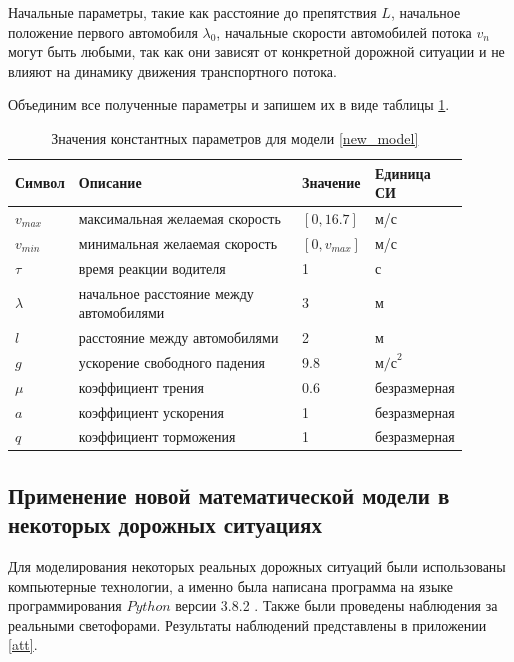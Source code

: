 \documentclass[12pt, a4paper]{extarticle}
\numberwithin{equation}{section}
\numberwithin{figure}{section}
\begin{document}
Начальные параметры, такие как расстояние до препятствия $L$, начальное положение первого автомобиля $\lambda_0$, начальные скорости автомобилей потока $v_n$ могут быть любыми, так как они зависят от конкретной дорожной ситуации и не влияют на динамику движения транспортного потока.

Объединим все полученные параметры и запишем их в виде таблицы \ref{real_parameters}.
\begin{table}[h!]
	\caption{Значения константных параметров для модели \eqref{new_model} }
	\label{real_parameters}
	\begin{center}
		\begin{tabularx}{\textwidth}{p{0.12\linewidth}p{0.52\linewidth}p{0.11\linewidth}p{0.15\linewidth}}			
			\hline
			\rule{0cm}{0,5cm}
			Символ & Описание & Значение & Единица СИ \\
			[3pt]\hline
			$v_{max}$ & максимальная желаемая скорость& $[0,16.7]$&м/с\\
			$v_{min}$ & минимальная желаемая скорость& $[0,v_{max}]$&м/с\\ 
			$\tau$ & время реакции водителя& 1&с\\
			$\lambda$ & начальное расстояние между автомобилями& 3&м\\
			$l$ & расстояние между автомобилями& 2&м\\
			$g$ & ускорение свободного падения& 9.8&$\text{м/с}^2$\\ 
			$\mu$ & коэффициент трения& 0.6& безразмерная\\ 
			$a$ & коэффициент ускорения& 1& безразмерная\\
			$q$ & коэффициент торможения& 1& безразмерная\\
			\hline
		\end{tabularx}
	\end{center}
\end{table}
\newline 

\subsection{Применение новой математической модели в некоторых дорожных ситуациях}

Для моделирования некоторых реальных дорожных ситуаций были использованы компьютерные технологии, а именно была написана программа на языке программирования $Python$ версии 3.8.2 \cite{Python}. Также были проведены наблюдения за реальными светофорами. Результаты наблюдений представлены в приложении \ref{att}.
\end{document}
